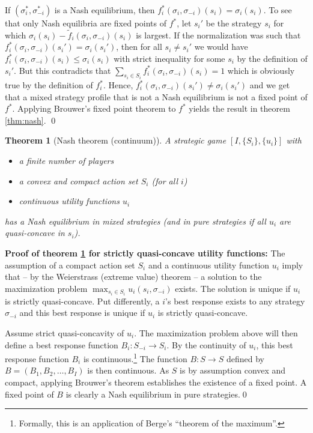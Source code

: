 \documentclass[a4paper,11pt]{article}
\newtheorem{theorem}{Theorem}
\begin{document}
If $(\sigma_i^*,\sigma_{-i}^*)$ is a Nash equilibrium, then $f_i^*(\sigma_i,\sigma_{-i})(s_i)=\sigma_i(s_i)$. To see that only Nash equilibria are fixed points of $f^*$, let $s_i'$ be the strategy $s_i$ for which $\sigma_i(s_i)-\tilde{f}_i(\sigma_i,\sigma_{-i})(s_i)$ is largest. If the normalization was such that $f_i^*(\sigma_i,\sigma_{-i})(s_i')=\sigma_i(s_i')$, then for all $s_i\neq s_i'$ we would have $f_i^*(\sigma_i,\sigma_{-i})(s_i)\leq\sigma_i(s_i)$ with strict inequality for some $s_i$ by the definition of $s_i'$. But this contradicts that $\sum_{s_i\in S_i}
f_i^*(\sigma_i,\sigma_{-i})(s_i)=1$ which is obviously true by the definition of $f_i^*$. Hence, $f_i^*(\sigma_i,\sigma_{-i})(s_i')\neq\sigma_i(s_i')$ and we get that a mixed strategy profile that is not a Nash equilibrium is not a fixed point of $f^*$. Applying Brouwer's fixed point theorem to $f^*$ yields the result in theorem \ref{thm:nash}. \qed

\begin{theorem}[Nash theorem (continuum)]\label{thm:nashContinuous}
A strategic game \([I, \{S_i\},\{u_i\}]\) with
\begin{itemize}
\item a finite number of players 
 \item a convex and compact action set $S_i$ (for all $i$)
\item continuous utility functions $u_i$
\end{itemize}
has a Nash equilibrium in mixed strategies (and in pure strategies if all \(u_i\) are quasi-concave in \(s_i\)).
\end{theorem}

\textbf{Proof of theorem \ref{thm:nashContinuous} for strictly quasi-concave utility functions: }The assumption of a compact action set $S_i$ and a continuous utility function $u_i$ imply that -- by the Weierstrass (extreme value) theorem -- a solution to the maximization problem $\max_{s_i\in S_i} u_i(s_i,\sigma_{-i})$ exists. The solution is unique if $u_i$ is strictly quasi-concave. Put differently, a $i$'s best response exists to any strategy $\sigma_{-i}$ and this best response is unique if $u_i$ is strictly quasi-concave.

Assume strict quasi-concavity of $u_i$. The maximization problem above will then define a best response function $B_i:S_{-i}\rightarrow S_i$. By the continuity of $u_i$, this best response function $B_i$ is continuous.\footnote{Formally, this is an application of Berge's ``theorem of the maximum''.} The function $B:S\rightarrow S$ defined by $B=(B_1,B_2,\dots,B_I)$ is then continuous. As $S$ is by assumption convex and compact, applying Brouwer's theorem establishes the existence of a fixed point. A fixed point of $B$ is clearly a Nash equilibrium in pure strategies.\qed
\end{document}
